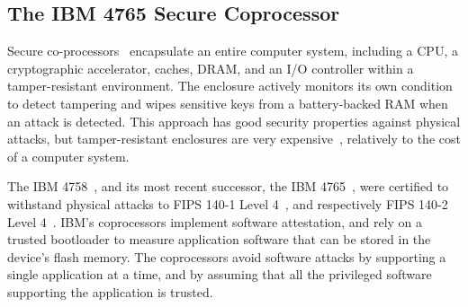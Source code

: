 \subsection{The IBM 4765 Secure Coprocessor}

Secure co-processors~\cite{yee1994coprocessors} encapsulate an entire computer
system, including a CPU, a cryptographic accelerator, caches, DRAM, and an I/O
controller within a tamper-resistant environment. The enclosure actively
monitors its own condition to detect tampering and wipes sensitive keys from a
battery-backed RAM when an attack is detected. This approach has good security
properties against physical attacks, but tamper-resistant enclosures are very
expensive~\cite{anderson2001security}, relatively to the cost of a computer
system.

The IBM 4758~\cite{smith1999ibm4758}, and its most recent successor, the
IBM 4765~\cite{nist2015ibm4765}, were certified to withstand physical attacks
to FIPS 140-1 Level 4~\cite{smith1999validating}, and respectively FIPS 140-2
Level 4~\cite{nist2011fipscert}. IBM's coprocessors implement software
attestation, and rely on a trusted bootloader to measure application software
that can be stored in the device's flash memory. The coprocessors avoid
software attacks by supporting a single application at a time, and by assuming
that all the privileged software supporting the application is trusted.
